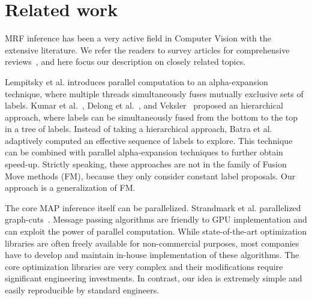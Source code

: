 \section{Related work}


MRF inference has been a very active field in Computer Vision with the
extensive literature. We refer the readers to survey articles for
comprehensive
reviews~\cite{middlebury_mrf,comparative_study_of_modern_inference}, and
here focus our description on closely related topics.


\noindent Lempitsky et al. introduces parallel computation to an
alpha-expansion technique, where multiple threads simultaneously fuses
mutually exclusive sets of labels. Kumar et
al.~\cite{hierarchical_graph_cuts_kumar_and_koller}, Delong et
al.~\cite{delong_hierarchical_fusion}, and Veksler~\cite{olga_hierarchical_alpha_expansion} proposed an hierarchical
approach, where labels can be simultaneously fused from the bottom to
the top in a tree of labels. 
% 
Instead of taking a hierarchical approach, Batra et
al.~\cite{Dhruv_pushmeet_making_the_right_move} adaptively computed an
effective sequence of labels to explore. This technique can be combined
with parallel alpha-expansion techniques to further obtain speed-up.
%
Strictly speaking, these approaches are not in the family of Fusion Move
methods (FM), because they only consider constant label proposals. Our
approach is a generalization of FM.



\noindent The core MAP inference itself can be parallelized.  Strandmark
et al. parallelized graph-cuts~\cite{strandmark_parallel}.
%
Message passing algorithms are friendly to GPU implementation and can
exploit the power of parallel computation.
%
%
While state-of-the-art optimization libraries are often freely available
for non-commercial purposes, most companies have to develop and maintain
in-house implementation of these algorithms.  The core optimization
libraries are very complex and their modifications require significant
engineering investments. In contrast, our idea is extremely simple and
easily reproducible by standard engineers.





